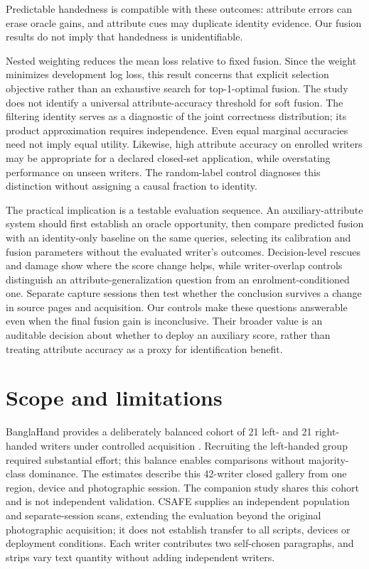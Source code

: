 Predictable handedness \cite{prappo2026handedness} is compatible with these outcomes: attribute errors can erase oracle gains, and attribute cues may duplicate identity evidence. Our fusion results do not imply that handedness is unidentifiable.

Nested weighting reduces the mean loss relative to fixed fusion. Since the weight minimizes development log loss, this result concerns that explicit selection objective rather than an exhaustive search for top-1-optimal fusion. The study does not identify a universal attribute-accuracy threshold for soft fusion. The filtering identity serves as a diagnostic of the joint correctness distribution; its product approximation requires independence. Even equal marginal accuracies need not imply equal utility. Likewise, high attribute accuracy on enrolled writers may be appropriate for a declared closed-set application, while overstating performance on unseen writers. The random-label control diagnoses this distinction without assigning a causal fraction to identity.




The practical implication is a testable evaluation sequence. An auxiliary-attribute system should first establish an oracle opportunity, then compare predicted fusion with an identity-only baseline on the same queries, selecting its calibration and fusion parameters without the evaluated writer's outcomes. Decision-level rescues and damage show where the score change helps, while writer-overlap controls distinguish an attribute-generalization question from an enrolment-conditioned one. Separate capture sessions then test whether the conclusion survives a change in source pages and acquisition. Our controls make these questions answerable even when the final fusion gain is inconclusive. Their broader value is an auditable decision about whether to deploy an auxiliary score, rather than treating attribute accuracy as a proxy for identification benefit.

\section{Scope and limitations}
BanglaHand provides a deliberately balanced cohort of 21 left- and 21 right-handed writers under controlled acquisition \cite{banglahand2026data}. Recruiting the left-handed group required substantial effort; this balance enables comparisons without majority-class dominance. The estimates describe this 42-writer closed gallery from one region, device and photographic session. The companion study shares this cohort and is not independent validation. CSAFE supplies an independent population and separate-session scans, extending the evaluation beyond the original photographic acquisition; it does not establish transfer to all scripts, devices or deployment conditions. Each writer contributes two self-chosen paragraphs, and strips vary text quantity without adding independent writers.

